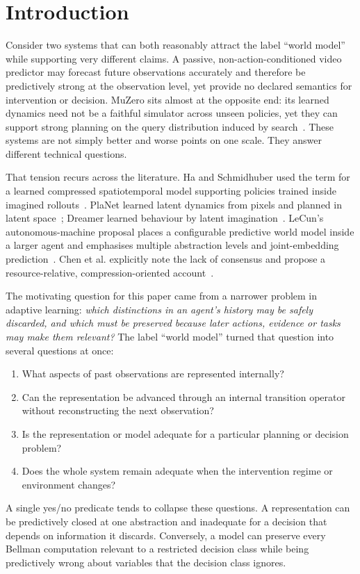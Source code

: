 \documentclass[10pt]{article}
\begin{document}
\section{Introduction}

Consider two systems that can both reasonably attract the label ``world model'' while supporting very different claims. A passive, non-action-conditioned video predictor may forecast future observations accurately and therefore be predictively strong at the observation level, yet provide no declared semantics for intervention or decision. MuZero sits almost at the opposite end: its learned dynamics need not be a faithful simulator across unseen policies, yet they can support strong planning on the query distribution induced by search~\cite{schrittwieser2020,he2024}. These systems are not simply better and worse points on one scale. They answer different technical questions.

That tension recurs across the literature. Ha and Schmidhuber used the term for a learned compressed spatiotemporal model supporting policies trained inside imagined rollouts~\cite{ha2018}. PlaNet learned latent dynamics from pixels and planned in latent space~\cite{hafner2019}; Dreamer learned behaviour by latent imagination~\cite{hafner2020}. LeCun's autonomous-machine proposal places a configurable predictive world model inside a larger agent and emphasises multiple abstraction levels and joint-embedding prediction~\cite{lecun2022}. Chen et al. explicitly note the lack of consensus and propose a resource-relative, compression-oriented account~\cite{chen2026}.

The motivating question for this paper came from a narrower problem in adaptive learning: \emph{which distinctions in an agent's history may be safely discarded, and which must be preserved because later actions, evidence or tasks may make them relevant?} The label ``world model'' turned that question into several questions at once:
\begin{enumerate}
    \item What aspects of past observations are represented internally?
    \item Can the representation be advanced through an internal transition operator without reconstructing the next observation?
    \item Is the representation or model adequate for a particular planning or decision problem?
    \item Does the whole system remain adequate when the intervention regime or environment changes?
\end{enumerate}
A single yes/no predicate tends to collapse these questions. A representation can be predictively closed at one abstraction and inadequate for a decision that depends on information it discards. Conversely, a model can preserve every Bellman computation relevant to a restricted decision class while being predictively wrong about variables that the decision class ignores.
\end{document}
